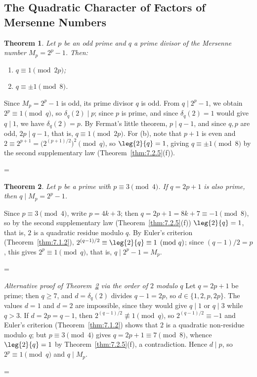 \documentclass[11pt]{article}
\makeatletter
\theoremstyle{ntstyle}
\newtheorem{theorem}{Theorem}[subsection]
\let\nt@closedisplay\]
\def\nt@guardedclose{\@ifnextchar\par{\nt@closeafterpar}{\@ifnextchar\end{\postdisplaypenalty\@M\nt@closedisplay}{\nt@closedisplay}}}
\def\nt@closeafterpar\par{\@ifnextchar\par{\nt@closeafterpar}{\@ifnextchar\end{\postdisplaypenalty\@M\nt@closedisplay\par}{\nt@closedisplay\par}}}
\renewenvironment{proof}[1][\proofname]{\par
  \pushQED{\qed}\normalfont\topsep\medskipamount\edef\nt@afterproof{\@endparpenalty=\the\@endparpenalty\relax}\@beginparpenalty\@M\@endparpenalty\@M\let\]\nt@guardedclose\trivlist\item[]\textit{#1\@addpunct{.}} \ignorespaces}{\ifvmode\addpenalty\@M\fi\popQED\nt@afterproof\endtrivlist\@endpefalse}
\newenvironment{altproof}[1][\proofname]{\begin{proof}[#1]\renewcommand{\qedsymbol}{}}{\end{proof}}
\makeatother
\begin{document}
\subsection{The Quadratic Character of Factors of Mersenne Numbers}

\begin{theorem}\label{thm:9.2.1} Let $p$ be an odd prime and $q$ a
	prime divisor of the Mersenne number $M_p = 2^p - 1$. Then:
	\begin{enumerate}[label={\alph*)}]
		\item $q\equiv 1 \pmod{2p}$;
		\item $q \equiv \pm 1 \pmod{8}$.
	\end{enumerate}

\end{theorem}

\begin{proof} Since $M_p = 2^{p} - 1$ is odd, its prime
	divisor $q$ is odd. From $q \mid 2^p - 1$, we obtain $2^p \equiv 1 \pmod{q}$, so $\delta_q(2) \mid p$; since $p$ is prime, and since
	$\delta_q(2) = 1$ would give $q \mid 1$, we have
	$\delta_q(2) = p$. By Fermat's little theorem, $p \mid q - 1$, and since
	$q, p$ are odd, $2p \mid q - 1$, that is, $q \equiv 1 \pmod{2p}$. For
	(b), note that $p+1$ is even and $2 \equiv 2^{p+1} = \big(2^{(p+1)/2}\big)^2
		\pmod{q}$, so $\leg{2}{q} = 1$, giving $q \equiv \pm 1
		\pmod{8}$ by the second supplementary law (Theorem~\ref{thm:7.2.5}(f)).

\end{proof}
\begin{theorem}\label{thm:9.2.2} Let $p$ be a prime with $p \equiv 3 \pmod{4}$. If $q = 2p
		+ 1$ is also prime, then $q \mid M_p = 2^{p} - 1$.

\end{theorem}

\begin{proof} Since $p \equiv 3 \pmod{4}$, write $p = 4k +
		3$; then $q = 2p + 1 = 8k + 7 \equiv -1 \pmod{8}$, so by the second
	supplementary law (Theorem~\ref{thm:7.2.5}(f)) $\leg{2}{q} = 1$, that is, $2$ is a
	quadratic residue modulo $q$. By Euler's criterion (Theorem~\ref{thm:7.1.2}),
	$2^{(q-1)/2} \equiv \leg{2}{q} \equiv 1 \pmod{q}$; since
	$(q-1)/2 = p$, this gives $2^{p} \equiv 1 \pmod{q}$, that is, $q \mid
		2^{p} - 1 = M_p$.

\end{proof}
\begin{altproof}[Alternative proof of Theorem~\ref{thm:9.2.2} via the order of $2$ modulo $q$]
	Let $q=2p+1$ be prime; then $q\ge7$, and $d=\delta_q(2)$ divides
	$q-1=2p$, so $d\in\{1,2,p,2p\}$. The values $d=1$ and $d=2$ are
	impossible, since they would give $q\mid1$ or $q\mid3$ while $q>3$. If
	$d=2p=q-1$, then $2^{(q-1)/2}\not\equiv1\pmod{q}$, so
	$2^{(q-1)/2}\equiv-1$ and Euler's criterion (Theorem~\ref{thm:7.1.2}) shows that $2$ is
	a quadratic non-residue modulo $q$; but $p\equiv3\pmod{4}$ gives
	$q=2p+1\equiv7\pmod{8}$, whence $\leg{2}{q}=1$ by Theorem~\ref{thm:7.2.5}(f),
	a contradiction. Hence $d\mid p$, so $2^{p}\equiv1\pmod{q}$
	and $q\mid M_p$.

\end{altproof}
\end{document}
